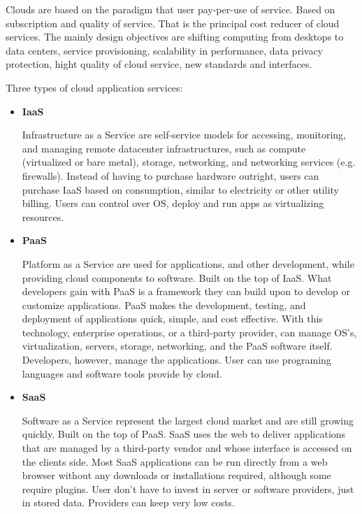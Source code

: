 \documentclass[12pt]{report}
\begin{document}
Clouds are based on the paradigm that user pay-per-use of service. Based on subscription and quality of service. That is the principal cost reducer of cloud services. The mainly design objectives are shifting computing from desktops to data centers, service provisioning, scalability in performance, data privacy protection, hight quality of cloud service, new standards and interfaces. 

Three types of cloud application services:
\begin{itemize}
\item \textbf{IaaS}

			Infrastructure as a Service are self-service models for accessing, monitoring, and managing remote datacenter infrastructures, such as compute (virtualized or bare metal), storage, networking, and networking services (e.g. firewalls). Instead of having to purchase hardware outright, users can purchase IaaS based on consumption, similar to electricity or other utility billing. Users can control over OS, deploy and run apps as virtualizing resources.
\item \textbf{PaaS}

			Platform as a Service are used for applications, and other development, while providing cloud components to software. Built on the top of IaaS. What developers gain with PaaS is a framework they can build upon to develop or customize applications. PaaS makes the development, testing, and deployment of applications quick, simple, and cost effective. With this technology, enterprise operations, or a third-party provider, can manage OS's, virtualization, servers, storage, networking, and the PaaS software itself. Developers, however, manage the applications. User can use programing languages and software tools provide by cloud.
\item \textbf{SaaS} 

			Software as a Service represent the largest cloud market and are still growing quickly. Built on the top of PaaS. SaaS uses the web to deliver applications that are managed by a third-party vendor and whose interface is accessed on the clients side. Most SaaS applications can be run directly from a web browser without any downloads or installations required, although some require plugins. User don't have to invest in server or software providers, just in stored data. Providers can keep very low costs.
\end{itemize}
\end{document}
